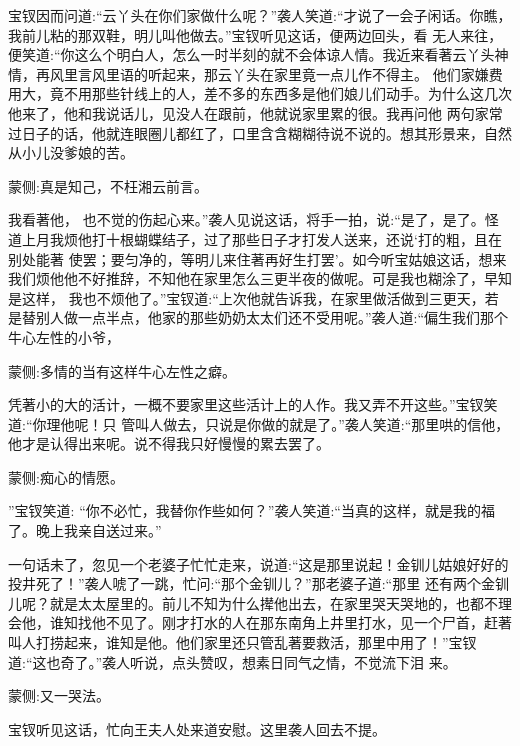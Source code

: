 \begin{parag}
    宝钗因而问道:“云丫头在你们家做什么呢？”袭人笑道:“才说了一会子闲话。你瞧，我前儿粘的那双鞋，明儿叫他做去。”宝钗听见这话，便两边回头，看 无人来往，便笑道:“你这么个明白人，怎么一时半刻的就不会体谅人情。我近来看著云丫头神情，再风里言风里语的听起来，那云丫头在家里竟一点儿作不得主。 他们家嫌费用大，竟不用那些针线上的人，差不多的东西多是他们娘儿们动手。为什么这几次他来了，他和我说话儿，见没人在跟前，他就说家里累的很。我再问他 两句家常过日子的话，他就连眼圈儿都红了，口里含含糊糊待说不说的。想其形景来，自然从小儿没爹娘的苦。\begin{note}蒙侧:真是知己，不枉湘云前言。\end{note}我看著他， 也不觉的伤起心来。”袭人见说这话，将手一拍，说:“是了，是了。怪道上月我烦他打十根蝴蝶结子，过了那些日子才打发人送来，还说‘打的粗，且在别处能著 使罢；要匀净的，等明儿来住著再好生打罢’。如今听宝姑娘这话，想来我们烦他他不好推辞，不知他在家里怎么三更半夜的做呢。可是我也糊涂了，早知是这样， 我也不烦他了。”宝钗道:“上次他就告诉我，在家里做活做到三更天，若是替别人做一点半点，他家的那些奶奶太太们还不受用呢。”袭人道:“偏生我们那个牛心左性的小爷，\begin{note}蒙侧:多情的当有这样牛心左性之癖。\end{note}凭著小的大的活计，一概不要家里这些活计上的人作。我又弄不开这些。”宝钗笑道:“你理他呢！只 管叫人做去，只说是你做的就是了。”袭人笑道:“那里哄的信他，他才是认得出来呢。说不得我只好慢慢的累去罢了。\begin{note}蒙侧:痴心的情愿。\end{note}”宝钗笑道: “你不必忙，我替你作些如何？”袭人笑道:“当真的这样，就是我的福了。晚上我亲自送过来。”
\end{parag}


\begin{parag}
    一句话未了，忽见一个老婆子忙忙走来，说道:“这是那里说起！金钏儿姑娘好好的投井死了！”袭人唬了一跳，忙问:“那个金钏儿？”那老婆子道:“那里 还有两个金钏儿呢？就是太太屋里的。前儿不知为什么撵他出去，在家里哭天哭地的，也都不理会他，谁知找他不见了。刚才打水的人在那东南角上井里打水，见一个尸首，赶著叫人打捞起来，谁知是他。他们家里还只管乱著要救活，那里中用了！”宝钗道:“这也奇了。”袭人听说，点头赞叹，想素日同气之情，不觉流下泪 来。\begin{note}蒙侧:又一哭法。\end{note}宝钗听见这话，忙向王夫人处来道安慰。这里袭人回去不提。
\end{parag}


